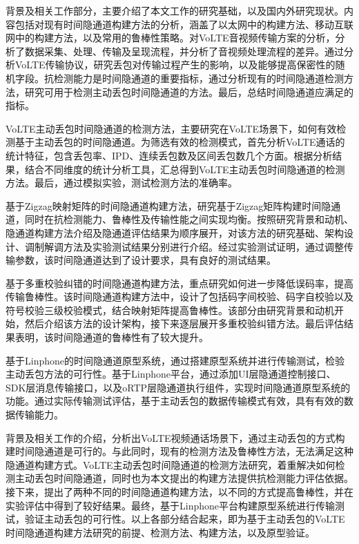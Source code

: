 背景及相关工作部分，主要介绍了本文工作的研究基础，以及国内外研究现状。内容包括对现有时间隐通道构建方法的分析，涵盖了以太网中的构建方法、移动互联网中的构建方法，以及常用的鲁棒性策略。对VoLTE音视频传输方案的分析，分析了数据采集、处理、传输及呈现流程，并分析了音视频处理流程的差异。通过分析VoLTE传输协议，研究丢包对传输过程产生的影响，以及能够提高保密性的随机字段。抗检测能力是时间隐通道的重要指标，通过分析现有的时间隐通道检测方法，研究可用于检测主动丢包时间隐通道的方法。最后，总结时间隐通道应满足的指标。

VoLTE主动丢包时间隐通道的检测方法，主要研究在VoLTE场景下，如何有效检测基于主动丢包的时间隐通道。为筛选有效的检测模式，首先分析VoLTE通话的统计特征，包含丢包率、IPD、连续丢包数及区间丢包数几个方面。根据分析结果，结合不同维度的统计分析工具，汇总得到VoLTE主动丢包时间隐通道的检测方法。最后，通过模拟实验，测试检测方法的准确率。

基于Zigzag映射矩阵的时间隐通道构建方法，研究基于Zigzag矩阵构建时间隐通道，同时在抗检测能力、鲁棒性及传输性能之间实现均衡。按照研究背景和动机、隐通道构建方法介绍及隐通道评估结果为顺序展开，对该方法的研究基础、架构设计、调制解调方法及实验测试结果分别进行介绍。经过实验测试证明，通过调整传输参数，该时间隐通道达到了设计要求，具有良好的测试结果。

基于多重校验纠错的时间隐通道构建方法，重点研究如何进一步降低误码率，提高传输鲁棒性。该时间隐通道构建方法中，设计了包括码字间校验、码字自校验以及符号校验三级校验模式，结合映射矩阵提高鲁棒性。该部分由研究背景和动机开始，然后介绍该方法的设计架构，接下来逐层展开多重校验纠错方法。最后评估结果表明，该时间隐通道的鲁棒性有了较大提升。

基于Linphone的时间隐通道原型系统，通过搭建原型系统并进行传输测试，检验主动丢包方法的可行性。基于Linphone平台，通过添加UI层隐通道控制接口、SDK层消息传输接口，以及oRTP层隐通道执行组件，实现时间隐通道原型系统的功能。通过实际传输测试评估，基于主动丢包的数据传输模式有效，具有有效的数据传输能力。

背景及相关工作的介绍，分析出VoLTE视频通话场景下，通过主动丢包的方式构建时间隐通道是可行的。与此同时，现有的检测方法及鲁棒性方法，无法满足这种隐通道构建方式。VoLTE主动丢包时间隐通道的检测方法研究，着重解决如何检测主动丢包时间隐通道，同时也为本文提出的构建方法提供抗检测能力评估依据。接下来，提出了两种不同的时间隐通道构建方法，以不同的方式提高鲁棒性，并在实验评估中得到了较好结果。最终，基于Linphone平台构建原型系统进行传输测试，验证主动丢包的可行性。以上各部分结合起来，即为基于主动丢包的VoLTE时间隐通道构建方法研究的前提、检测方法、构建方法，以及原型验证。

